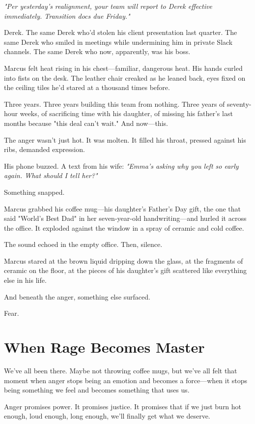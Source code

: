 \documentclass[11pt,twoside]{book}
\begin{document}
\textit{"Per yesterday's realignment, your team will report to Derek effective immediately. Transition docs due Friday."}

Derek. The same Derek who'd stolen his client presentation last quarter. The same Derek who smiled in meetings while undermining him in private Slack channels. The same Derek who now, apparently, was his boss.

Marcus felt heat rising in his chest—familiar, dangerous heat. His hands curled into fists on the desk. The leather chair creaked as he leaned back, eyes fixed on the ceiling tiles he'd stared at a thousand times before.

Three years. Three years building this team from nothing. Three years of seventy-hour weeks, of sacrificing time with his daughter, of missing his father's last months because "this deal can't wait." And now—this.

The anger wasn't just hot. It was molten. It filled his throat, pressed against his ribs, demanded expression.

His phone buzzed. A text from his wife: \textit{"Emma's asking why you left so early again. What should I tell her?"}

Something snapped.

Marcus grabbed his coffee mug—his daughter's Father's Day gift, the one that said "World's Best Dad" in her seven-year-old handwriting—and hurled it across the office. It exploded against the window in a spray of ceramic and cold coffee.

The sound echoed in the empty office. Then, silence.

Marcus stared at the brown liquid dripping down the glass, at the fragments of ceramic on the floor, at the pieces of his daughter's gift scattered like everything else in his life.

And beneath the anger, something else surfaced.

Fear.

\section*{When Rage Becomes Master}

We've all been there. Maybe not throwing coffee mugs, but we've all felt that moment when anger stops being an emotion and becomes a force—when it stops being something we feel and becomes something that uses us.

Anger promises power. It promises justice. It promises that if we just burn hot enough, loud enough, long enough, we'll finally get what we deserve.
\end{document}
